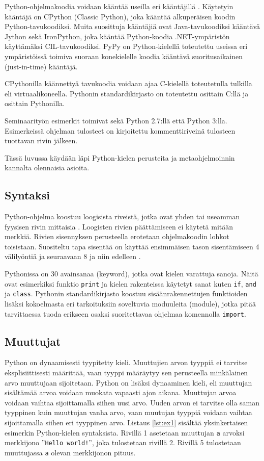 \documentclass[finnish]{tktltiki2}
\theoremstyle{definition}
\theoremstyle{remark}
\begin{document}
Python-ohjelmakoodia voidaan kääntää useilla eri kääntäjillä \cite[s. 5]{martelli2006python}. Käytetyin kääntäjä on CPython (Classic Python), joka kääntää alkuperäisen koodin Python-tavukoodiksi. Muita suosittuja kääntäjiä ovat Java-tavukoodiksi kääntävä Jython sekä IronPython, joka kääntää Python-koodia .NET-ympäristön käyttämäksi CIL-tavukoodiksi. PyPy on Python-kielellä toteutettu useissa eri ympäristöissä toimiva suoraan konekielelle koodia kääntävä suoritusaikainen (just-in-time) kääntäjä. 

CPythonilla käännettyä tavukoodia voidaan ajaa C-kielellä toteutetulla tulkilla \cite[s. 22]{martelli2006python} eli virtuaalikoneella. Pythonin standardikirjasto on toteutettu osittain C:llä ja osittain Pythonilla.

Seminaarityön esimerkit toimivat sekä Python 2.7:llä että Python 3:lla. Esimerkeissä ohjelman tulosteet on kirjoitettu kommenttiriveinä tulosteen tuottavan rivin jälkeen.

Tässä luvussa käydään läpi Python-kielen perusteita ja metaohjelmoinnin kannalta olennaisia asioita.

\subsection{Syntaksi}

Python-ohjelma koostuu loogisista riveistä, jotka ovat yhden tai useamman fyysisen rivin mittaisia \cite[s. 33]{martelli2006python}. Loogisten rivien päättämiseen ei käytetä mitään merkkiä. Rivien sisennyksen perusteella erotetaan ohjelmakoodin lohkot toisistaan. Suositeltu tapa sisentää on käyttää ensimmäisen tason sisentämiseen 4 välilyöntiä ja seuraavaan 8 ja niin edelleen \cite{pep8}. 

Pythonissa on 30 avainsanaa (keyword), jotka ovat kielen varattuja sanoja. Näitä ovat esimerkiksi funktio \verb|print| ja kielen rakenteissa käytetyt sanat kuten \verb|if|, \verb|and| ja \verb|class|. Pythonin standardikirjasto koostuu sisäänrakennettujen funktioiden lisäksi kokoelmasta eri tarkoituksiin soveltuvia moduuleita (module), jotka pitää tarvittaessa tuoda erikseen osaksi suoritettavaa ohjelmaa komennolla \verb|import|.

\subsection{Muuttujat}

Python on dynaamisesti tyypitetty kieli. Muuttujien arvon tyyppiä ei tarvitse eksplisiittisesti määrittää, vaan tyyppi määräytyy sen perusteella minkälainen arvo muuttujaan sijoitetaan. Python on lisäksi dynaaminen kieli, eli muuttujan sisältämää arvoa voidaan muokata vapaasti ajon aikana. Muuttujan arvoa voidaan vaihtaa sijoittamalla siihen uusi arvo. Uuden arvon ei tarvitse olla saman tyyppinen kuin muuttujan vanha arvo, vaan muutujan tyyppiä voidaan vaihtaa sijoittamalla siihen eri tyyppinen arvo. Listaus \ref{lst:ex1} sisältää yksinkertaisen esimerkin Python-kielen syntaksista. Rivillä 1 asetetaan muuttujan \verb|a| arvoksi merkkijono ''\verb|Hello world!|'', joka tulostetaan rivillä 2. Rivillä 5 tulostetaan muuttujassa \verb|a| olevan merkkijonon pituus.
\end{document}
